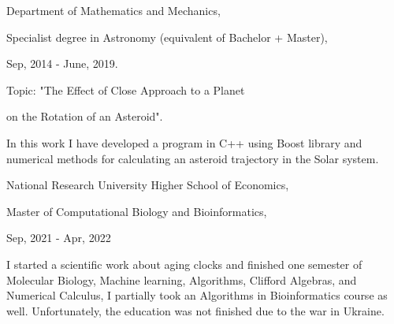 \documentclass[11pt]{article}
\begin{document}
\begin{multicols}{2}
Department of Mathematics and Mechanics,

Specialist degree in Astronomy (equivalent of Bachelor + Master),

Sep, 2014 - June, 2019.

\vspace{0.5em}


\vspace{0.5em}

\indent \indent Topic: "The Effect of Close Approach to a Planet 

\indent \indent on the Rotation of an Asteroid".

\indent \indent In this work I have developed a program in 
\indent \indent C++ using Boost library and numerical methods 
\indent \indent for calculating an asteroid trajectory in the Solar 
\indent \indent system. \href{https://github.com/eluator/dipvlom}{}
 
\vspace{0.5em}


National Research University Higher School of Economics,

Master of Computational Biology and Bioinformatics,

Sep, 2021 - Apr, 2022

I started a scientific work about aging clocks and finished one semester of Molecular Biology, Machine learning, Algorithms, Clifford Algebras, and Numerical Calculus, I partially took an Algorithms in Bioinformatics course as well. Unfortunately, the education was not finished due to the war in Ukraine.

\vspace{0.5em}

\end{multicols}

\newpage
\end{document}
